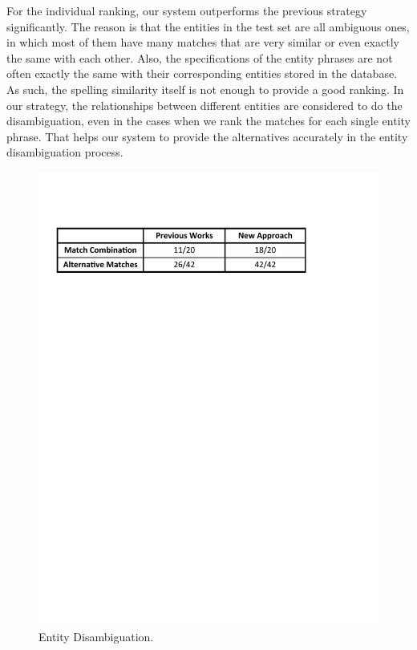 \documentclass{vldb}
\begin{document}
For the individual ranking, our system outperforms the previous strategy significantly.  The reason is that the entities in the test set are all ambiguous ones, in which most of them have many matches that are very similar or even exactly the same with each other.  Also, the specifications of the entity phrases are not often exactly the same with their corresponding entities stored in the database.  As such, the spelling similarity itself is not enough to provide a good ranking.  In our strategy, the relationships between different entities are considered to do the disambiguation, even in the cases when we rank the matches for each single entity phrase.  That helps our system to provide the alternatives accurately in the entity disambiguation process.   

\begin{figure}
  \center
  \includegraphics[width=0.95\linewidth]{pic/expEntity.pdf}
  \caption{Entity Disambiguation.}
  \label{fig:expEntity}
\end{figure}
\end{document}
